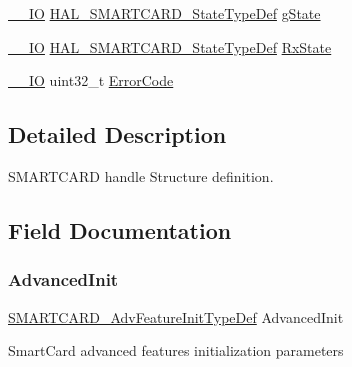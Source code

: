 \begin{DoxyCompactItemize}
\item 
\hyperlink{core__sc300_8h_aec43007d9998a0a0e01faede4133d6be}{\+\_\+\+\_\+\+IO} \hyperlink{group___s_m_a_r_t_c_a_r_d___exported___types_ga79d6a3b95636861dcfd70913746e087e}{H\+A\+L\+\_\+\+S\+M\+A\+R\+T\+C\+A\+R\+D\+\_\+\+State\+Type\+Def} \hyperlink{struct_s_m_a_r_t_c_a_r_d___handle_type_def_ab83dd4a85483f5c160a277aeaae6d5df}{g\+State}
\item 
\hyperlink{core__sc300_8h_aec43007d9998a0a0e01faede4133d6be}{\+\_\+\+\_\+\+IO} \hyperlink{group___s_m_a_r_t_c_a_r_d___exported___types_ga79d6a3b95636861dcfd70913746e087e}{H\+A\+L\+\_\+\+S\+M\+A\+R\+T\+C\+A\+R\+D\+\_\+\+State\+Type\+Def} \hyperlink{struct_s_m_a_r_t_c_a_r_d___handle_type_def_a62906a4946a18afa45ff4c374152dd28}{Rx\+State}
\item 
\hyperlink{core__sc300_8h_aec43007d9998a0a0e01faede4133d6be}{\+\_\+\+\_\+\+IO} uint32\+\_\+t \hyperlink{struct_s_m_a_r_t_c_a_r_d___handle_type_def_a123c5063e6a3b1901b2fbe5f88c53a7e}{Error\+Code}
\end{DoxyCompactItemize}


\subsection{Detailed Description}
S\+M\+A\+R\+T\+C\+A\+RD handle Structure definition. 

\subsection{Field Documentation}
\mbox{\label{struct_s_m_a_r_t_c_a_r_d___handle_type_def_a061d77764f1e674b0dde9823245948ee}} 
\subsubsection{\texorpdfstring{Advanced\+Init}{AdvancedInit}}
{\footnotesize\ttfamily \hyperlink{struct_s_m_a_r_t_c_a_r_d___adv_feature_init_type_def}{S\+M\+A\+R\+T\+C\+A\+R\+D\+\_\+\+Adv\+Feature\+Init\+Type\+Def} Advanced\+Init}

Smart\+Card advanced features initialization parameters \mbox{\label{struct_s_m_a_r_t_c_a_r_d___handle_type_def_a123c5063e6a3b1901b2fbe5f88c53a7e}} 
